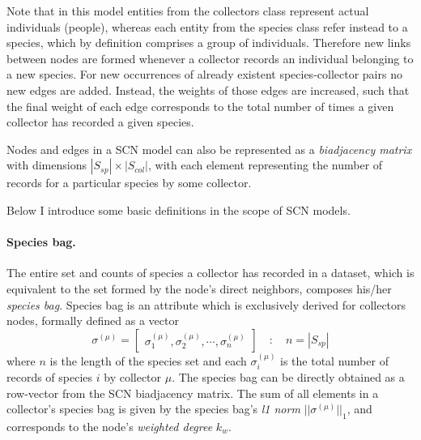 Note that in this model entities from the collectors class represent actual individuals (people), whereas each entity from the species class refer instead to a species, which by definition comprises a group of individuals. 
Therefore new links between nodes are formed whenever a collector records an individual belonging to a new species. 
For new occurrences of already existent species-collector pairs no new edges are added. Instead, the weights of those edges are increased, such that the final weight of each edge corresponds to the total number of times a given collector has recorded a given species.

Nodes and edges in a SCN model can also be represented as a \textit{biadjacency matrix} with dimensions $|S_{sp}|\times|S_{col}|$, with each element representing the number of records for a particular species by some collector.

Below I introduce some basic definitions in the scope of SCN models.

\paragraph{Species bag.} 
The entire set and counts of species a collector has recorded in a dataset, which is equivalent to the set formed by the node's direct neighbors, composes his/her \textit{species bag}.
Species bag is an attribute which is exclusively derived for collectors nodes, formally defined as a vector
$$
\sigma^{(\mu)} =  \begin{bmatrix}
\sigma_1^{(\mu)}, \sigma_2^{(\mu)}, \cdots, \sigma_n^{(\mu)}
\end{bmatrix}  \quad : \quad 
n = |S_{sp}|
$$
where $n$ is the length of the species set and each $\sigma_i^{(\mu)}$ is the total number of records of species $i$ by collector $\mu$. 
The species bag can be directly obtained as a row-vector from the SCN biadjacency matrix.
The sum of all elements in a collector's species bag is given by the species bag's \textit{l1 norm} $|| \sigma^{(\mu)} ||_1$, and corresponds to the node's \textit{weighted degree} $k_w$.
 
